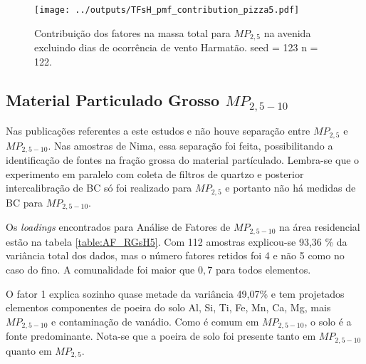 \begin{landscape}
  \begin{figure}
    \centering
    \begin{minipage}[b]{0.45\linewidth}
      \texttt{[image: ../outputs/TFsH\_pmf\_contribution\_pizza5.pdf]}
      \caption{Contribuição dos fatores na massa total para $MP_{2,5}$ na avenida
               excluindo dias de ocorrência de vento Harmatão. seed = 123 n = 122.
               \label{fig:TFsH_contribution5}}
    \end{minipage}%
    \hspace{0.5cm}
    \begin{minipage}[b]{0.45\linewidth}
      
    \end{minipage}
  \end{figure}
\end{landscape}
 
\subsection{Material Particulado Grosso $MP_{2,5-10}$}

Nas publicações referentes a este estudos \citet{ARKU2008} e 
\citet{DIONISIO2010} não houve separação entre $MP_{2,5}$ e $MP_{2,5-10}$. 
Nas amostras de Nima, essa separação foi feita, possibilitando a identificação
de fontes na fração grossa do material partículado. Lembra-se que o experimento
em paralelo com coleta de filtros de quartzo e posterior intercalibração de BC
só foi realizado para $MP_{2,5}$ e portanto não há medidas de BC para 
$MP_{2,5-10}$.

Os \textit{loadings} encontrados para Análise de Fatores de $MP_{2,5-10}$
na área residencial estão na tabela \ref{table:AF_RGsH5}. Com 112 
amostras explicou-se 93,36 \% da variância total dos dados, mas o número 
fatores retidos foi 4 e não 5 como no caso do fino. A comunalidade foi maior 
que $0,7$ para todos elementos.

O fator 1 explica sozinho quase metade da variância 49,07\% e tem 
projetados elementos componentes de poeira do solo Al, Si, Ti, Fe, Mn, Ca, 
Mg, mais $MP_{2,5-10}$ e contaminação de vanádio. Como é comum em $MP_{2,5-10}$, 
o solo é a fonte predominante. Nota-se que a poeira de solo foi presente 
tanto em $MP_{2,5-10}$ quanto em $MP_{2,5}$.

